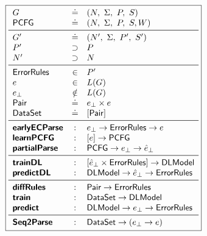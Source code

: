 \begin{figure}[h]
\small
\begin{minipage}[c]{\linewidth}
  \lstDeleteShortInline{|}
  \[
  \boxed{
  \begin{array}{lcl}
    G              & \defeq  & (N,\ \Sigma,\ P,\ S) \\
    \pcfgsym       & \defeq  & (N,\ \Sigma,\ P,\ S, W) \\
    \midrule
    G'             & \defeq  & (N',\ \Sigma,\ P',\ S') \\
    P'             & \supset & P \\
    N'             & \supset & N \\
    \midrule
    \errorrulessym & \in     & P' \\
    e              & \in    & L(G) \\
    e_{\bot}       & \notin & L(G) \\
    \pairsym      & \defeq & e_{\bot} \times e \\
    \datasetsym   & \defeq & \List{\pairsym} \\
    \midrule
    \ecepsym       & : & e_{\bot} \to \errorrulessym \to e \\
    \learnPCFGsym  & : & \List{e} \to \pcfgsym \\
    \partialsym    & : & \pcfgsym \to e_{\bot} \to \hat{e}_{\bot}  \\
    \midrule
    \trainDLsym    & : & \List{\hat{e}_{\bot} \times \errorrulessym} \to \Model \\
    \predictDLsym  & : & \Model \to \hat{e}_{\bot} \to \errorrulessym \\
    \midrule
    \diffsym       & : & \pairsym \to \errorrulessym \\
    \trainsym      & : & \datasetsym \to \Model \\
    \predictsym    & : & \Model \to e_{\bot} \to \errorrulessym \\
    \midrule
    \systemsym     & : & \datasetsym \to (e_{\bot} \to e) \\
  \end{array}
  }
  \]
  \lstMakeShortInline[mathescape=true]{|}
  \label{fig:api}
\end{minipage}
\end{figure}
